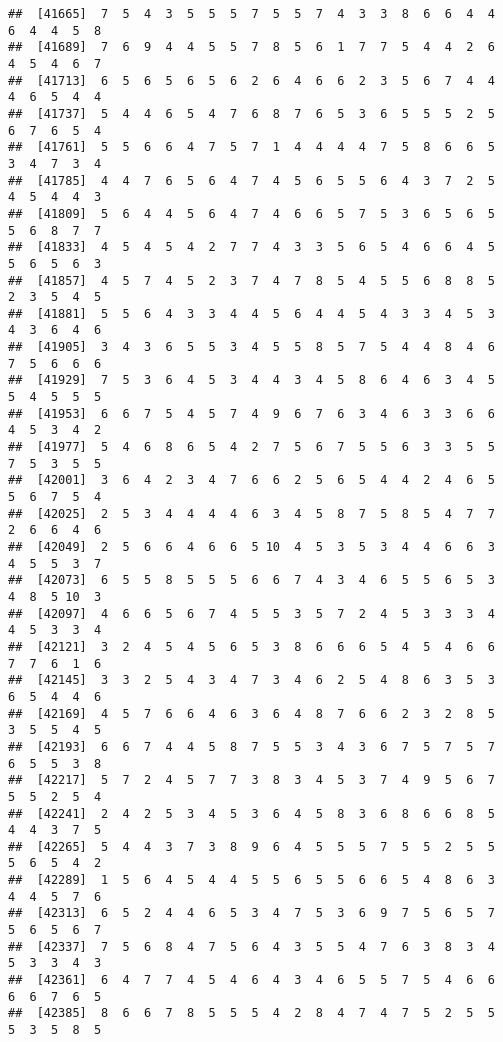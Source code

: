\documentclass[
]{book}
\begin{document}
\begin{verbatim}
##  [41665]  7  5  4  3  5  5  5  7  5  5  7  4  3  3  8  6  6  4  4  6  4  4  5  8
##  [41689]  7  6  9  4  4  5  5  7  8  5  6  1  7  7  5  4  4  2  6  4  5  4  6  7
##  [41713]  6  5  6  5  6  5  6  2  6  4  6  6  2  3  5  6  7  4  4  4  6  5  4  4
##  [41737]  5  4  4  6  5  4  7  6  8  7  6  5  3  6  5  5  5  2  5  6  7  6  5  4
##  [41761]  5  5  6  6  4  7  5  7  1  4  4  4  4  7  5  8  6  6  5  3  4  7  3  4
##  [41785]  4  4  7  6  5  6  4  7  4  5  6  5  5  6  4  3  7  2  5  4  5  4  4  3
##  [41809]  5  6  4  4  5  6  4  7  4  6  6  5  7  5  3  6  5  6  5  5  6  8  7  7
##  [41833]  4  5  4  5  4  2  7  7  4  3  3  5  6  5  4  6  6  4  5  5  6  5  6  3
##  [41857]  4  5  7  4  5  2  3  7  4  7  8  5  4  5  5  6  8  8  5  2  3  5  4  5
##  [41881]  5  5  6  4  3  3  4  4  5  6  4  4  5  4  3  3  4  5  3  4  3  6  4  6
##  [41905]  3  4  3  6  5  5  3  4  5  5  8  5  7  5  4  4  8  4  6  7  5  6  6  6
##  [41929]  7  5  3  6  4  5  3  4  4  3  4  5  8  6  4  6  3  4  5  5  4  5  5  5
##  [41953]  6  6  7  5  4  5  7  4  9  6  7  6  3  4  6  3  3  6  6  4  5  3  4  2
##  [41977]  5  4  6  8  6  5  4  2  7  5  6  7  5  5  6  3  3  5  5  7  5  3  5  5
##  [42001]  3  6  4  2  3  4  7  6  6  2  5  6  5  4  4  2  4  6  5  5  6  7  5  4
##  [42025]  2  5  3  4  4  4  4  6  3  4  5  8  7  5  8  5  4  7  7  2  6  6  4  6
##  [42049]  2  5  6  6  4  6  6  5 10  4  5  3  5  3  4  4  6  6  3  4  5  5  3  7
##  [42073]  6  5  5  8  5  5  5  6  6  7  4  3  4  6  5  5  6  5  3  4  8  5 10  3
##  [42097]  4  6  6  5  6  7  4  5  5  3  5  7  2  4  5  3  3  3  4  4  5  3  3  4
##  [42121]  3  2  4  5  4  5  6  5  3  8  6  6  6  5  4  5  4  6  6  7  7  6  1  6
##  [42145]  3  3  2  5  4  3  4  7  3  4  6  2  5  4  8  6  3  5  3  6  5  4  4  6
##  [42169]  4  5  7  6  6  4  6  3  6  4  8  7  6  6  2  3  2  8  5  3  5  5  4  5
##  [42193]  6  6  7  4  4  5  8  7  5  5  3  4  3  6  7  5  7  5  7  6  5  5  3  8
##  [42217]  5  7  2  4  5  7  7  3  8  3  4  5  3  7  4  9  5  6  7  5  5  2  5  4
##  [42241]  2  4  2  5  3  4  5  3  6  4  5  8  3  6  8  6  6  8  5  4  4  3  7  5
##  [42265]  5  4  4  3  7  3  8  9  6  4  5  5  5  7  5  5  2  5  5  5  6  5  4  2
##  [42289]  1  5  6  4  5  4  4  5  5  6  5  5  6  6  5  4  8  6  3  4  4  5  7  6
##  [42313]  6  5  2  4  4  6  5  3  4  7  5  3  6  9  7  5  6  5  7  5  6  5  6  7
##  [42337]  7  5  6  8  4  7  5  6  4  3  5  5  4  7  6  3  8  3  4  5  3  3  4  3
##  [42361]  6  4  7  7  4  5  4  6  4  3  4  6  5  5  7  5  4  6  6  6  6  7  6  5
##  [42385]  8  6  6  7  8  5  5  5  4  2  8  4  7  4  7  5  2  5  5  5  3  5  8  5

\end{verbatim}
\end{document}
